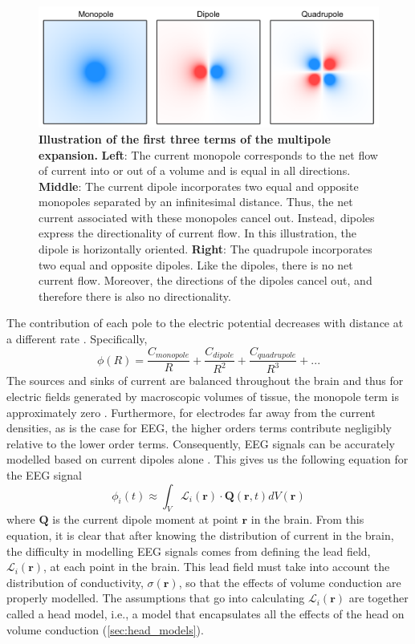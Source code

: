 \begin{figure}[t!]
	\centering
	\includegraphics[width=\textwidth]{Figures/chapter1/multipole_expansion.pdf}
    
    \caption{\textbf{Illustration of the first three terms of the multipole expansion.} \textbf{Left}: The current monopole corresponds to the net flow of current into or out of a volume and is equal in all directions. \textbf{Middle}: The current dipole incorporates two equal and opposite monopoles separated by an infinitesimal distance. Thus, the net current associated with these monopoles cancel out. Instead, dipoles express the directionality of current flow. In this illustration, the dipole is horizontally oriented. \textbf{Right}: The quadrupole incorporates two equal and opposite dipoles. Like the dipoles, there is no net current flow. Moreover, the directions of the dipoles cancel out, and therefore there is also no directionality. } 
    \label{fig:multipole}
\end{figure}

The contribution of each pole to the electric potential decreases with distance at a different rate \cite{Nunez2006}. Specifically,
\begin{equation}
    \phi(R) = \frac{C_{monopole}}{R} + \frac{C_{dipole}}{R^2}  + \frac{C_{quadrupole}}{R^3}  + ...
\end{equation}
The sources and sinks of current are balanced throughout the brain and thus for electric fields generated by macroscopic volumes of tissue, the monopole term is approximately zero \cite{Nunez2006}. Furthermore, for electrodes far away from the current densities, as is the case for EEG, the higher orders terms contribute negligibly relative to the lower order terms. Consequently, EEG signals can be accurately modelled based on current dipoles alone \cite{Nunez2006,RevModPhys.65.413}. This gives us the following equation for the EEG signal \cite{RevModPhys.65.413}
\begin{equation} \label{eq:lead_solution}
    \phi_i(t) \approx \int_V \mathcal{L}_i(\bm{r}) \cdot \bm{Q}(\bm{r},t) dV(\bm{r})
\end{equation}
where $\bm{Q}$ is the current dipole moment at point $\bm{r}$ in the brain. From this equation, it is clear that after knowing the distribution of current in the brain, the difficulty in modelling EEG signals comes from defining the lead field, $\mathcal{L}_i(\bm{r})$, at each point in the brain. This lead field must take into account the distribution of conductivity, $\sigma(\bm{r})$, so that the effects of volume conduction are properly modelled. The assumptions that go into calculating $\mathcal{L}_i(\bm{r})$ are together called a head model, i.e., a model that encapsulates all the effects of the head on volume conduction (\autoref{sec:head_models}).

